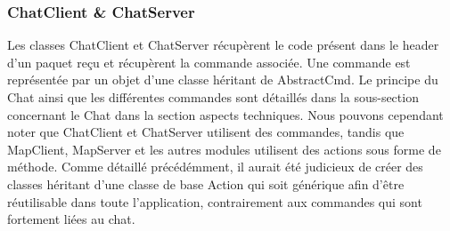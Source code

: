 \subsubsection{ChatClient \& ChatServer}
Les classes ChatClient et ChatServer récupèrent le code présent dans le header d'un paquet reçu et récupèrent la commande associée. Une commande est représentée par un objet d'une classe héritant de AbstractCmd. Le principe du Chat ainsi que les différentes commandes sont détaillés dans la sous-section concernant le Chat dans la section aspects techniques. Nous pouvons cependant noter que ChatClient et ChatServer utilisent des commandes, tandis que MapClient, MapServer et les autres modules utilisent des actions sous forme de méthode. Comme détaillé précédémment, il aurait été judicieux de créer des classes héritant d'une classe de base Action qui soit générique afin d'être réutilisable dans toute l'application, contrairement aux commandes qui sont fortement liées au chat.